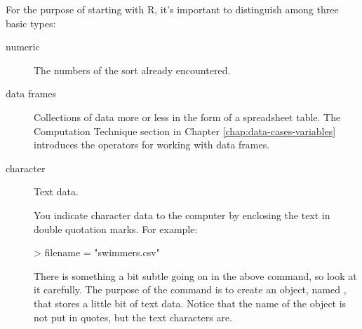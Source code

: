 For the purpose
of starting with R, it's important to distinguish among three basic
types:
\begin{description}
\item[numeric] The numbers of the sort already encountered.

\item[data frames] Collections of data more or less in the form of a
  spreadsheet table.  The Computation Technique section
in Chapter \ref{chap:data-cases-variables} introduces the operators
for working with data frames.

\item[character] Text data.


You indicate character data to the computer by enclosing the text in
double quotation marks.  For example:
\begin{Schunk}
\begin{Sinput}
> filename = "swimmers.csv"
\end{Sinput}
\end{Schunk}
There is something a bit subtle going on in the above command, so
look at it carefully.  The purpose of the command is to create an
object, named , that stores a little bit of text data.
Notice that the name of the object is not put in quotes, but the text
characters are.  


\end{description}
